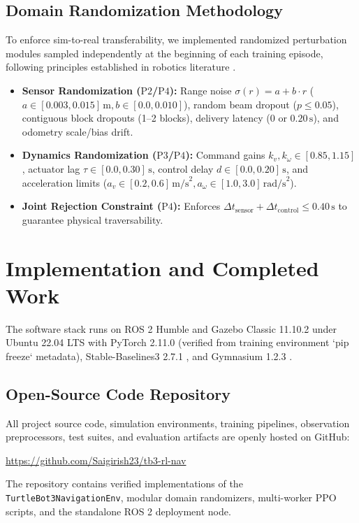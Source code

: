 \documentclass[conference]{IEEEtran}
\begin{document}
\subsection{Domain Randomization Methodology}
To enforce sim-to-real transferability, we implemented randomized perturbation modules sampled independently at the beginning of each training episode, following principles established in robotics literature \cite{tobin2017domain, peng2018sim}.
\begin{itemize}
    \item \textbf{Sensor Randomization ($\text{P2}$/$\text{P4}$):} Range noise $\sigma(r) = a + b \cdot r$ ($a \in [0.003, 0.015]\,\text{m}, b \in [0.0, 0.010]$), random beam dropout ($p \le 0.05$), contiguous block dropouts (1--2 blocks), delivery latency ($0$ or $0.20\,\text{s}$), and odometry scale/bias drift.
    \item \textbf{Dynamics Randomization ($\text{P3}$/$\text{P4}$):} Command gains $k_v, k_\omega \in [0.85, 1.15]$, actuator lag $\tau \in [0.0, 0.30]\,\text{s}$, control delay $d \in [0.0, 0.20]\,\text{s}$, and acceleration limits ($a_v \in [0.2, 0.6]\,\text{m/s}^2, a_\omega \in [1.0, 3.0]\,\text{rad/s}^2$).
    \item \textbf{Joint Rejection Constraint ($\text{P4}$):} Enforces $\Delta t_{\text{sensor}} + \Delta t_{\text{control}} \le 0.40\,\text{s}$ to guarantee physical traversability.
\end{itemize}

\section{Implementation and Completed Work}
The software stack runs on ROS 2 Humble \cite{macenski2022robot} and Gazebo Classic 11.10.2 \cite{koenig2004design} under Ubuntu 22.04 LTS with PyTorch 2.11.0 (verified from training environment `pip freeze` metadata), Stable-Baselines3 2.7.1 \cite{raffin2021stable}, and Gymnasium 1.2.3 \cite{towers2023gymnasium}.

\subsection{Open-Source Code Repository}
All project source code, simulation environments, training pipelines, observation preprocessors, test suites, and evaluation artifacts are openly hosted on GitHub:
\begin{center}
\url{https://github.com/Saigirish23/tb3-rl-nav}
\end{center}
The repository contains verified implementations of the \texttt{TurtleBot3NavigationEnv}, modular domain randomizers, multi-worker PPO scripts, and the standalone ROS 2 deployment node.
\end{document}
